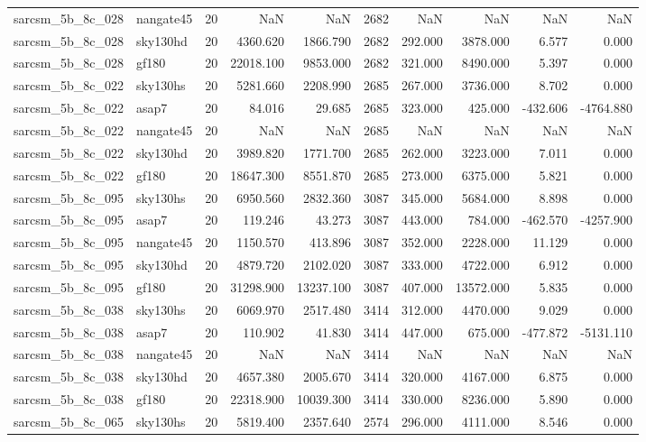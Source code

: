 \begin{tabular}{llrrrrrrrr}
sarcsm\_5b\_8c\_028 & nangate45 & 20 & NaN & NaN & 2682 & NaN & NaN & NaN & NaN \\
sarcsm\_5b\_8c\_028 & sky130hd & 20 & 4360.620 & 1866.790 & 2682 & 292.000 & 3878.000 & 6.577 & 0.000 \\
sarcsm\_5b\_8c\_028 & gf180 & 20 & 22018.100 & 9853.000 & 2682 & 321.000 & 8490.000 & 5.397 & 0.000 \\
sarcsm\_5b\_8c\_022 & sky130hs & 20 & 5281.660 & 2208.990 & 2685 & 267.000 & 3736.000 & 8.702 & 0.000 \\
sarcsm\_5b\_8c\_022 & asap7 & 20 & 84.016 & 29.685 & 2685 & 323.000 & 425.000 & -432.606 & -4764.880 \\
sarcsm\_5b\_8c\_022 & nangate45 & 20 & NaN & NaN & 2685 & NaN & NaN & NaN & NaN \\
sarcsm\_5b\_8c\_022 & sky130hd & 20 & 3989.820 & 1771.700 & 2685 & 262.000 & 3223.000 & 7.011 & 0.000 \\
sarcsm\_5b\_8c\_022 & gf180 & 20 & 18647.300 & 8551.870 & 2685 & 273.000 & 6375.000 & 5.821 & 0.000 \\
sarcsm\_5b\_8c\_095 & sky130hs & 20 & 6950.560 & 2832.360 & 3087 & 345.000 & 5684.000 & 8.898 & 0.000 \\
sarcsm\_5b\_8c\_095 & asap7 & 20 & 119.246 & 43.273 & 3087 & 443.000 & 784.000 & -462.570 & -4257.900 \\
sarcsm\_5b\_8c\_095 & nangate45 & 20 & 1150.570 & 413.896 & 3087 & 352.000 & 2228.000 & 11.129 & 0.000 \\
sarcsm\_5b\_8c\_095 & sky130hd & 20 & 4879.720 & 2102.020 & 3087 & 333.000 & 4722.000 & 6.912 & 0.000 \\
sarcsm\_5b\_8c\_095 & gf180 & 20 & 31298.900 & 13237.100 & 3087 & 407.000 & 13572.000 & 5.835 & 0.000 \\
sarcsm\_5b\_8c\_038 & sky130hs & 20 & 6069.970 & 2517.480 & 3414 & 312.000 & 4470.000 & 9.029 & 0.000 \\
sarcsm\_5b\_8c\_038 & asap7 & 20 & 110.902 & 41.830 & 3414 & 447.000 & 675.000 & -477.872 & -5131.110 \\
sarcsm\_5b\_8c\_038 & nangate45 & 20 & NaN & NaN & 3414 & NaN & NaN & NaN & NaN \\
sarcsm\_5b\_8c\_038 & sky130hd & 20 & 4657.380 & 2005.670 & 3414 & 320.000 & 4167.000 & 6.875 & 0.000 \\
sarcsm\_5b\_8c\_038 & gf180 & 20 & 22318.900 & 10039.300 & 3414 & 330.000 & 8236.000 & 5.890 & 0.000 \\
sarcsm\_5b\_8c\_065 & sky130hs & 20 & 5819.400 & 2357.640 & 2574 & 296.000 & 4111.000 & 8.546 & 0.000 \\

\end{tabular}

